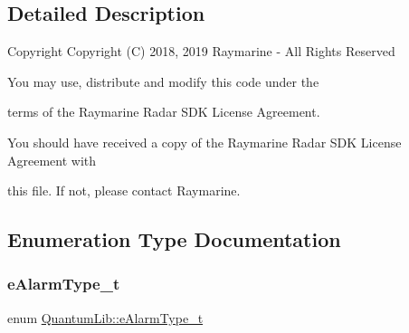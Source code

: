 \subsection{Detailed Description}
\begin{DoxyCopyright}{Copyright}
Copyright (C) 2018, 2019 Raymarine -\/ All Rights Reserved 

You may use, distribute and modify this code under the 

terms of the Raymarine Radar S\+DK License Agreement. 

You should have received a copy of the Raymarine Radar S\+DK License Agreement with 

this file. If not, please contact Raymarine. 
\end{DoxyCopyright}


\subsection{Enumeration Type Documentation}
\mbox{\label{namespace_quantum_lib_a63dd10ad28888fcad99c7b8c5f155750}} 
\subsubsection{\texorpdfstring{e\+Alarm\+Type\+\_\+t}{eAlarmType\_t}}
{\footnotesize\ttfamily enum \mbox{\hyperlink{namespace_quantum_lib_a63dd10ad28888fcad99c7b8c5f155750}{Quantum\+Lib\+::e\+Alarm\+Type\+\_\+t}}}

